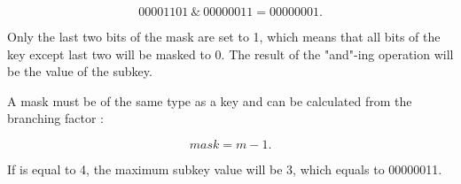 \begin{equation}
    00001101 \ \& \ 00000011 = 00000001.
\end{equation}

Only the last two bits of the mask are set to 1, which means that all bits of the key except last two will be masked to 0. The result of the "and"-ing operation will be the value of the subkey.

A mask must be of the same type as a key and can be calculated from the branching factor \m:

\begin{equation}
    \mathit{mask} = m - 1.
\end{equation}

If \m{} is equal to 4, the maximum subkey value will be 3, which equals to 00000011.

